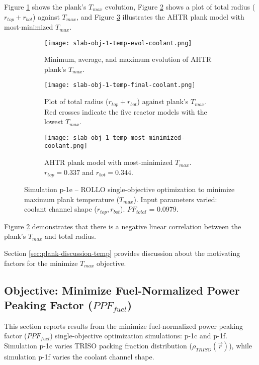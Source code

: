Figure \ref{fig:slab-obj-1-temp-evol-coolant} shows the plank's $T_{max}$ evolution, 
Figure \ref{fig:slab-obj-1-temp-final-coolant} shows a plot of total radius 
($r_{top} + r_{bot}$) against $T_{max}$, and Figure 
\ref{fig:slab-obj-1-temp-most-minimized-coolant} illustrates the \gls{AHTR} plank model 
with most-minimized $T_{max}$. 
\begin{figure}[htbp!]
    \centering
    \begin{subfigure}{\textwidth}
        \texttt{[image: slab-obj-1-temp-evol-coolant.png]}
        \caption{Minimum, average, and maximum evolution of AHTR plank's $T_{max}$.}
        \label{fig:slab-obj-1-temp-evol-coolant} 
    \end{subfigure}
    \begin{subfigure}{\textwidth}
        \texttt{[image: slab-obj-1-temp-final-coolant.png]}
        \caption{Plot of total radius ($r_{top} + r_{bot}$) against plank's 
        $T_{max}$. Red crosses indicate the five reactor models with the 
        lowest $T_{max}$.}
        \label{fig:slab-obj-1-temp-final-coolant} 
    \end{subfigure}
    \begin{subfigure}{\textwidth}
        \texttt{[image: slab-obj-1-temp-most-minimized-coolant.png]}
        \caption{\gls{AHTR} plank model with most-minimized $T_{max}$. 
        $r_{top} = 0.337$ and $r_{bot} = 0.344$.}
        \label{fig:slab-obj-1-temp-most-minimized-coolant} 
    \end{subfigure}
    \caption{Simulation p-1e -- ROLLO single-objective optimization to minimize 
    maximum plank temperature ($T_{max}$). Input parameters varied: coolant channel shape 
    ($r_{top}, r_{bot}$). $PF_{total}$ = 0.0979.}
    \label{fig:slab-obj-1-temp-coolant}
\end{figure}

Figure \ref{fig:slab-obj-1-temp-final-coolant} demonstrates that there is a negative 
linear correlation between the plank's $T_{max}$ and total radius. 

Section \ref{sec:plank-discussion-temp} provides discussion about the motivating factors 
for the minimize $T_{max}$ objective. 

\subsection{Objective: Minimize Fuel-Normalized Power Peaking Factor ($PPF_{fuel}$)}
\label{sec:plank-1-obj-ppf}
This section reports results from the minimize fuel-normalized power peaking factor 
($PPF_{fuel}$) single-objective optimization simulations: p-1c and p-1f. 
Simulation p-1c varies \gls{TRISO} packing fraction distribution 
($\rho_{TRISO}(\vec{r})$), while simulation p-1f varies the coolant channel shape. 

